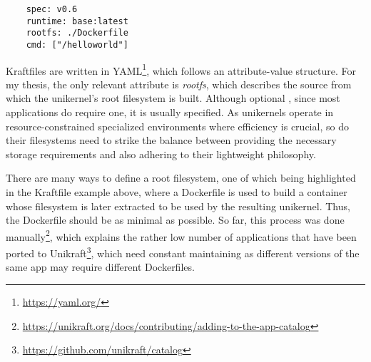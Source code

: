 \lstset{language=yaml,caption=Sample Kraftfile,label=lst:ex-kraftfile}
\begin{lstlisting}
    spec: v0.6
    runtime: base:latest
    rootfs: ./Dockerfile
    cmd: ["/helloworld"]  
\end{lstlisting}

Kraftfiles are written in YAML\footnote{\url{https://yaml.org/}}, which follows an attribute-value structure. For my thesis, the only relevant attribute is \textit{rootfs}, which
describes the source from which the unikernel's root filesystem is built. Although optional \cite{unikraft-filesystem}, since most applications do require one, it is usually specified.
As unikernels operate in resource-constrained specialized environments where efficiency is crucial, so do their filesystems need to strike the balance between
providing the necessary storage requirements and also adhering to their lightweight philosophy.

There are many ways to define a root filesystem, one of which being highlighted in the Kraftfile example above, where a Dockerfile is used to build a container whose filesystem is later extracted to be used
by the resulting unikernel. Thus, the Dockerfile should be as minimal as possible. So far, this process was done manually\footnote{
    \url{https://unikraft.org/docs/contributing/adding-to-the-app-catalog}
}, which explains the rather low number of applications that have been ported to Unikraft\footnote{
    \url{https://github.com/unikraft/catalog}
}, which need constant maintaining as different versions of the same app may require different Dockerfiles. 